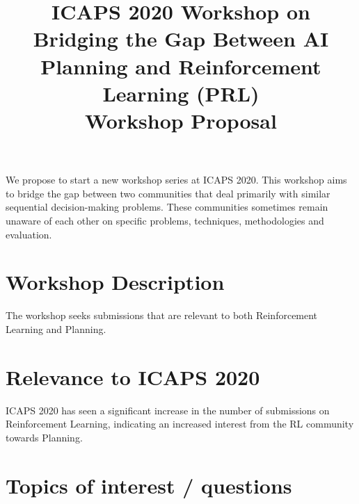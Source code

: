 \documentclass[10pt]{article}
\begin{document}
\title{ICAPS 2020 Workshop on \\ Bridging the Gap Between AI Planning and Reinforcement Learning (PRL)\\ \vspace*{0.7cm} Workshop Proposal
}
\date{}

\author{}

\maketitle


We propose to start a new workshop series at ICAPS 2020. This workshop aims to
bridge the gap between two communities that deal primarily with similar
sequential decision-making problems. These communities sometimes remain unaware
of each other on specific problems, techniques,  methodologies and evaluation.

\section*{Workshop Description}

The workshop seeks submissions that are relevant to both Reinforcement Learning
and Planning. 






\section*{Relevance to ICAPS 2020}
ICAPS 2020 has seen a significant increase in the number of submissions on
Reinforcement Learning, indicating an increased interest from the RL community
towards Planning.

\section*{Topics of interest / questions}
\end{document}
